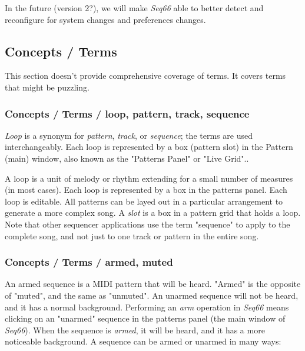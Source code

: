    In the future (version 2?), we will make \textsl{Seq66}
   able to better detect and
   reconfigure for system changes and preferences changes.

\subsection{Concepts / Terms}
\label{subsec:concepts_terms}

   This section doesn't provide comprehensive coverage of terms.  It
   covers terms that might be puzzling.

\subsubsection{Concepts / Terms / loop, pattern, track, sequence}
\label{subsubsec:concepts_terms_loop}

   \textsl{Loop} is a synonym for \textsl{pattern}, \textsl{track},
   or \textsl{sequence}; the terms are used interchangeably.
   Each loop is represented by a box (pattern slot) in the Pattern (main)
   window, also known as the "Patterns Panel" or "Live Grid"..

   A loop is a unit of melody or rhythm
   extending for a small number of measures (in most cases).
   Each loop is represented by a box in the patterns panel.
   Each loop is editable.  All patterns can be layed out in
   a particular arrangement to generate a more complex song.
   A \textsl{slot} is a box in a pattern grid that holds a loop.
   Note that other sequencer applications use the term "sequence"
   to apply to the complete song, and not just to one track or pattern in the
   entire song.

\subsubsection{Concepts / Terms / armed, muted}
\label{subsubsec:concepts_terms_armed}

   An armed sequence is a MIDI pattern that will be heard.
   "Armed" is the opposite of "muted", and the same as "unmuted".
   An unarmed sequence will not be heard, and it has a normal background.
   Performing an \textsl{arm} operation in \textsl{Seq66}
   means clicking on an "unarmed" sequence in the patterns panel (the main
   window of \textsl{Seq66}).
   When the sequence is \textsl{armed}, it will be heard, and it has a
   more noticeable background.
   A sequence can be armed or unarmed in many ways:

